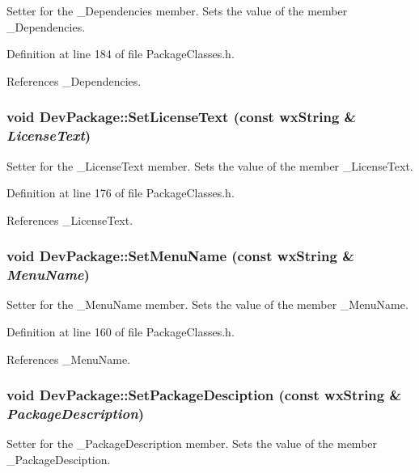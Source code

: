 Setter for the \_\-Dependencies member. Sets the value of the member \_\-Dependencies. 

Definition at line 184 of file Package\-Classes.h.

References \_\-Dependencies.
\subsubsection{\setlength{\rightskip}{0pt plus 5cm}void Dev\-Package::Set\-License\-Text (const wx\-String \& {\em License\-Text})\hspace{0.3cm}{\tt  [inline]}}\label{class_dev_package_105c50e218faabd3f174995c6855fc40}


Setter for the \_\-License\-Text member. Sets the value of the member \_\-License\-Text. 

Definition at line 176 of file Package\-Classes.h.

References \_\-License\-Text.
\subsubsection{\setlength{\rightskip}{0pt plus 5cm}void Dev\-Package::Set\-Menu\-Name (const wx\-String \& {\em Menu\-Name})\hspace{0.3cm}{\tt  [inline]}}\label{class_dev_package_73cf6e5aa71b80bb3ead0778710e808d}


Setter for the \_\-Menu\-Name member. Sets the value of the member \_\-Menu\-Name. 

Definition at line 160 of file Package\-Classes.h.

References \_\-Menu\-Name.
\subsubsection{\setlength{\rightskip}{0pt plus 5cm}void Dev\-Package::Set\-Package\-Desciption (const wx\-String \& {\em Package\-Description})\hspace{0.3cm}{\tt  [inline]}}\label{class_dev_package_801ebcd4968486a25d099d8901b0515b}


Setter for the \_\-Package\-Description member. Sets the value of the member \_\-Package\-Desciption. 

